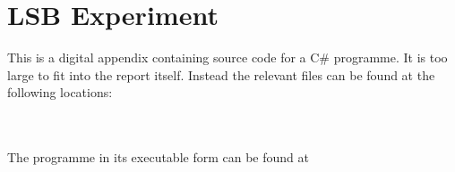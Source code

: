 \chapter{LSB Experiment}
\label{app:A}
This is a digital appendix containing source code for a C\# programme. It is too large to fit into the report itself.
Instead the relevant files can be found at the following locations:

\setlength{\parindent}{0pt} {
\\
 \\

The programme in its executable form can be found at \\
}